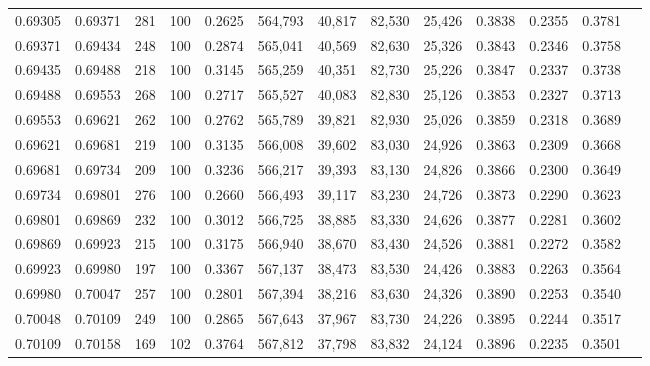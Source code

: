 \begin{tabular}{rrrrrrrrrrrrr}
0.69305 & 0.69371 &   281 & 100 &                                     0.2625 & 564,793 &  40,817 &  82,530 &  25,426 & 0.3838 & 0.2355 & 0.3781 \\
0.69371 & 0.69434 &   248 & 100 &                                     0.2874 & 565,041 &  40,569 &  82,630 &  25,326 & 0.3843 & 0.2346 & 0.3758 \\
0.69435 & 0.69488 &   218 & 100 &                                     0.3145 & 565,259 &  40,351 &  82,730 &  25,226 & 0.3847 & 0.2337 & 0.3738 \\
0.69488 & 0.69553 &   268 & 100 &                                     0.2717 & 565,527 &  40,083 &  82,830 &  25,126 & 0.3853 & 0.2327 & 0.3713 \\
0.69553 & 0.69621 &   262 & 100 &                                     0.2762 & 565,789 &  39,821 &  82,930 &  25,026 & 0.3859 & 0.2318 & 0.3689 \\
0.69621 & 0.69681 &   219 & 100 &                                     0.3135 & 566,008 &  39,602 &  83,030 &  24,926 & 0.3863 & 0.2309 & 0.3668 \\
0.69681 & 0.69734 &   209 & 100 &                                     0.3236 & 566,217 &  39,393 &  83,130 &  24,826 & 0.3866 & 0.2300 & 0.3649 \\
0.69734 & 0.69801 &   276 & 100 &                                     0.2660 & 566,493 &  39,117 &  83,230 &  24,726 & 0.3873 & 0.2290 & 0.3623 \\
0.69801 & 0.69869 &   232 & 100 &                                     0.3012 & 566,725 &  38,885 &  83,330 &  24,626 & 0.3877 & 0.2281 & 0.3602 \\
0.69869 & 0.69923 &   215 & 100 &                                     0.3175 & 566,940 &  38,670 &  83,430 &  24,526 & 0.3881 & 0.2272 & 0.3582 \\
0.69923 & 0.69980 &   197 & 100 &                                     0.3367 & 567,137 &  38,473 &  83,530 &  24,426 & 0.3883 & 0.2263 & 0.3564 \\
0.69980 & 0.70047 &   257 & 100 &                                     0.2801 & 567,394 &  38,216 &  83,630 &  24,326 & 0.3890 & 0.2253 & 0.3540 \\
0.70048 & 0.70109 &   249 & 100 &                                     0.2865 & 567,643 &  37,967 &  83,730 &  24,226 & 0.3895 & 0.2244 & 0.3517 \\
0.70109 & 0.70158 &   169 & 102 &                                     0.3764 & 567,812 &  37,798 &  83,832 &  24,124 & 0.3896 & 0.2235 & 0.3501 \\

\end{tabular}
